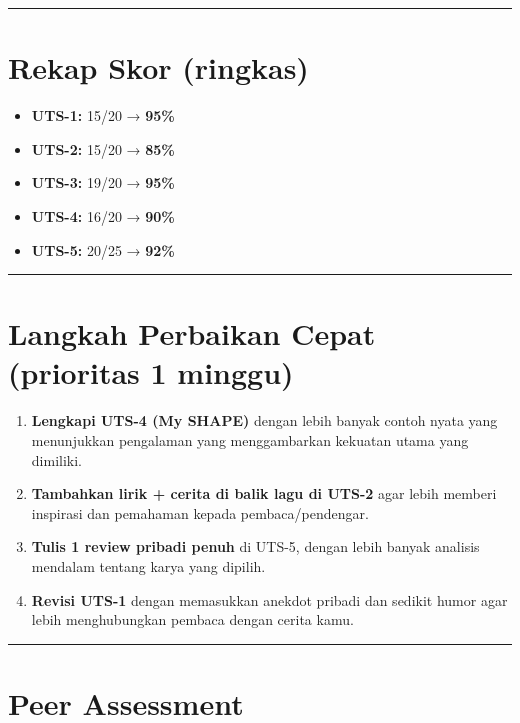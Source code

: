 \documentclass[
  letterpaper,
  DIV=11,
  numbers=noendperiod]{scrreprt}
\providecommand{\tightlist}{%
  \setlength{\itemsep}{0pt}\setlength{\parskip}{0pt}}
\begin{document}
\begin{center}\rule{0.5\linewidth}{0.5pt}\end{center}

\section{Rekap Skor (ringkas)}\label{rekap-skor-ringkas}

\begin{itemize}
\tightlist
\item
  \textbf{UTS-1:} 15/20 → \textbf{95\%}
\item
  \textbf{UTS-2:} 15/20 → \textbf{85\%}
\item
  \textbf{UTS-3:} 19/20 → \textbf{95\%}
\item
  \textbf{UTS-4:} 16/20 → \textbf{90\%}
\item
  \textbf{UTS-5:} 20/25 → \textbf{92\%}
\end{itemize}

\begin{center}\rule{0.5\linewidth}{0.5pt}\end{center}

\section{Langkah Perbaikan Cepat (prioritas 1
minggu)}\label{langkah-perbaikan-cepat-prioritas-1-minggu}

\begin{enumerate}
\def\labelenumi{\arabic{enumi}.}
\tightlist
\item
  \textbf{Lengkapi UTS-4 (My SHAPE)} dengan lebih banyak contoh nyata
  yang menunjukkan pengalaman yang menggambarkan kekuatan utama yang
  dimiliki.
\item
  \textbf{Tambahkan lirik + cerita di balik lagu di UTS-2} agar lebih
  memberi inspirasi dan pemahaman kepada pembaca/pendengar.
\item
  \textbf{Tulis 1 review pribadi penuh} di UTS-5, dengan lebih banyak
  analisis mendalam tentang karya yang dipilih.
\item
  \textbf{Revisi UTS-1} dengan memasukkan anekdot pribadi dan sedikit
  humor agar lebih menghubungkan pembaca dengan cerita kamu.
\end{enumerate}

\begin{center}\rule{0.5\linewidth}{0.5pt}\end{center}

\section{Peer Assessment}\label{peer-assessment}
\end{document}
